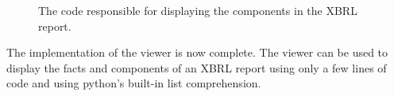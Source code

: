 \begin{figure}[H]
    \centering
    
    \caption{The code responsible for displaying the components in the XBRL report.}
    \label{fig:viewer_4}
\end{figure}

The implementation of the viewer is now complete.
The viewer can be used to display the facts and components of an XBRL report using only a few lines of code and using python's built-in list comprehension.






